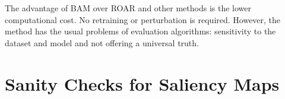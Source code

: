 

The advantage of BAM over ROAR \cite{hooker2019benchmark} and other methods is the lower computational cost. No retraining or perturbation is required. However, the method has the usual problems of evaluation algorithms: sensitivity to the dataset and model and not offering a universal truth.


\section{Sanity Checks for Saliency Maps}

